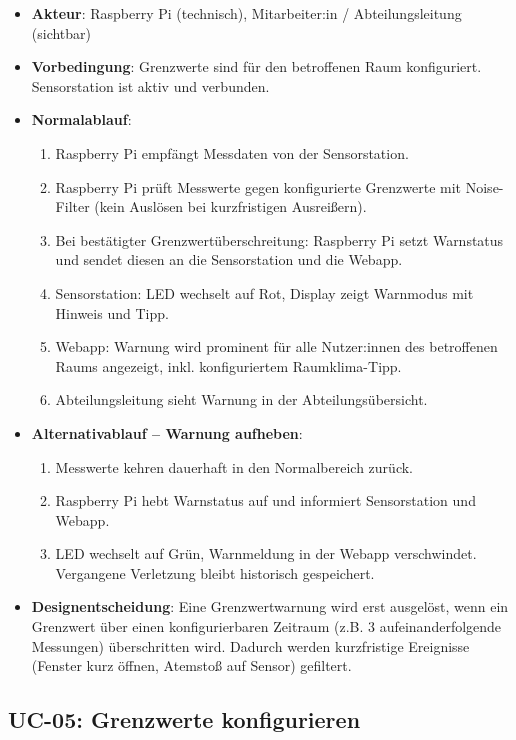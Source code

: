 \documentclass[12pt,a4paper]{article}
\begin{document}
\begin{itemize}
  \item \textbf{Akteur}: Raspberry Pi (technisch), Mitarbeiter:in / Abteilungsleitung (sichtbar)
  \item \textbf{Vorbedingung}: Grenzwerte sind für den betroffenen Raum konfiguriert. Sensorstation ist aktiv und verbunden.
  \item \textbf{Normalablauf}:
    \begin{enumerate}
      \item Raspberry Pi empfängt Messdaten von der Sensorstation.
      \item Raspberry Pi prüft Messwerte gegen konfigurierte Grenzwerte mit Noise-Filter (kein Auslösen bei kurzfristigen Ausreißern).
      \item Bei bestätigter Grenzwertüberschreitung: Raspberry Pi setzt Warnstatus und sendet diesen an die Sensorstation und die Webapp.
      \item Sensorstation: LED wechselt auf Rot, Display zeigt Warnmodus mit Hinweis und Tipp.
      \item Webapp: Warnung wird prominent für alle Nutzer:innen des betroffenen Raums angezeigt, inkl. konfiguriertem Raumklima-Tipp.
      \item Abteilungsleitung sieht Warnung in der Abteilungsübersicht.
    \end{enumerate}
  \item \textbf{Alternativablauf -- Warnung aufheben}:
    \begin{enumerate}
      \item Messwerte kehren dauerhaft in den Normalbereich zurück.
      \item Raspberry Pi hebt Warnstatus auf und informiert Sensorstation und Webapp.
      \item LED wechselt auf Grün, Warnmeldung in der Webapp verschwindet. Vergangene Verletzung bleibt historisch gespeichert.
    \end{enumerate}
  \item \textbf{Designentscheidung}: Eine Grenzwertwarnung wird erst ausgelöst, wenn ein Grenzwert über einen konfigurierbaren Zeitraum (z.B. 3 aufeinanderfolgende Messungen) überschritten wird. Dadurch werden kurzfristige Ereignisse (Fenster kurz öffnen, Atemstoß auf Sensor) gefiltert.
\end{itemize}

\subsection{UC-05: Grenzwerte konfigurieren}
\end{document}
